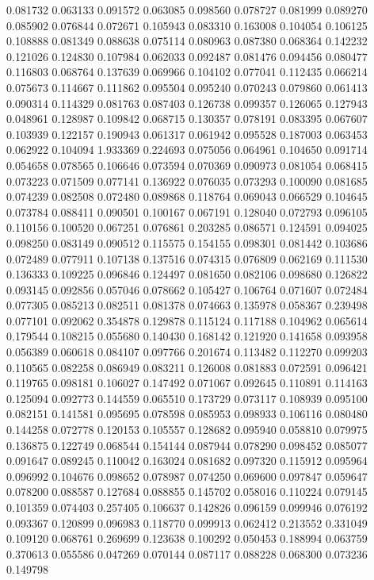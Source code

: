 0.081732
0.063133
0.091572
0.063085
0.098560
0.078727
0.081999
0.089270
0.085902
0.076844
0.072671
0.105943
0.083310
0.163008
0.104054
0.106125
0.108888
0.081349
0.088638
0.075114
0.080963
0.087380
0.068364
0.142232
0.121026
0.124830
0.107984
0.062033
0.092487
0.081476
0.094456
0.080477
0.116803
0.068764
0.137639
0.069966
0.104102
0.077041
0.112435
0.066214
0.075673
0.114667
0.111862
0.095504
0.095240
0.070243
0.079860
0.061413
0.090314
0.114329
0.081763
0.087403
0.126738
0.099357
0.126065
0.127943
0.048961
0.128987
0.109842
0.068715
0.130357
0.078191
0.083395
0.067607
0.103939
0.122157
0.190943
0.061317
0.061942
0.095528
0.187003
0.063453
0.062922
0.104094
1.933369
0.224693
0.075056
0.064961
0.104650
0.091714
0.054658
0.078565
0.106646
0.073594
0.070369
0.090973
0.081054
0.068415
0.073223
0.071509
0.077141
0.136922
0.076035
0.073293
0.100090
0.081685
0.074239
0.082508
0.072480
0.089868
0.118764
0.069043
0.066529
0.104645
0.073784
0.088411
0.090501
0.100167
0.067191
0.128040
0.072793
0.096105
0.110156
0.100520
0.067251
0.076861
0.203285
0.086571
0.124591
0.094025
0.098250
0.083149
0.090512
0.115575
0.154155
0.098301
0.081442
0.103686
0.072489
0.077911
0.107138
0.137516
0.074315
0.076809
0.062169
0.111530
0.136333
0.109225
0.096846
0.124497
0.081650
0.082106
0.098680
0.126822
0.093145
0.092856
0.057046
0.078662
0.105427
0.106764
0.071607
0.072484
0.077305
0.085213
0.082511
0.081378
0.074663
0.135978
0.058367
0.239498
0.077101
0.092062
0.354878
0.129878
0.115124
0.117188
0.104962
0.065614
0.179544
0.108215
0.055680
0.140430
0.168142
0.121920
0.141658
0.093958
0.056389
0.060618
0.084107
0.097766
0.201674
0.113482
0.112270
0.099203
0.110565
0.082258
0.086949
0.083211
0.126008
0.081883
0.072591
0.096421
0.119765
0.098181
0.106027
0.147492
0.071067
0.092645
0.110891
0.114163
0.125094
0.092773
0.144559
0.065510
0.173729
0.073117
0.108939
0.095100
0.082151
0.141581
0.095695
0.078598
0.085953
0.098933
0.106116
0.080480
0.144258
0.072778
0.120153
0.105557
0.128682
0.095940
0.058810
0.079975
0.136875
0.122749
0.068544
0.154144
0.087944
0.078290
0.098452
0.085077
0.091647
0.089245
0.110042
0.163024
0.081682
0.097320
0.115912
0.095964
0.096992
0.104676
0.098652
0.078987
0.074250
0.069600
0.097847
0.059647
0.078200
0.088587
0.127684
0.088855
0.145702
0.058016
0.110224
0.079145
0.101359
0.074403
0.257405
0.106637
0.142826
0.096159
0.099946
0.076192
0.093367
0.120899
0.096983
0.118770
0.099913
0.062412
0.213552
0.331049
0.109120
0.068761
0.269699
0.123638
0.100292
0.050453
0.188994
0.063759
0.370613
0.055586
0.047269
0.070144
0.087117
0.088228
0.068300
0.073236
0.149798
